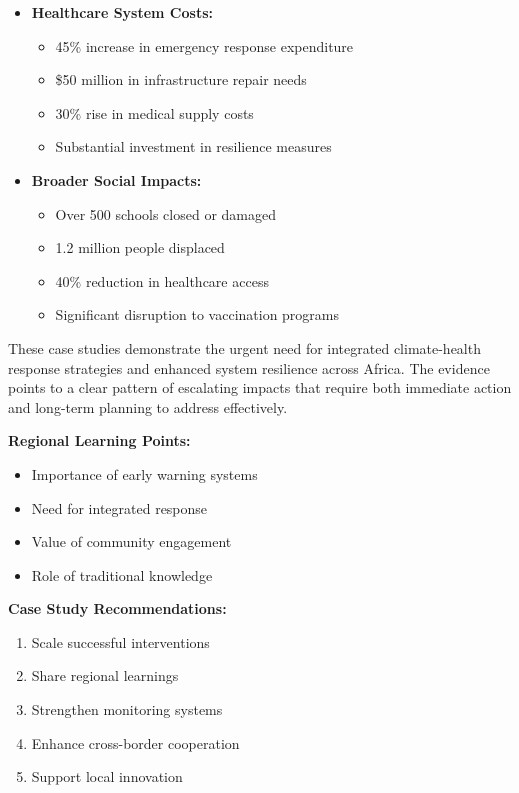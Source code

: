 \begin{itemize}
    \item \textbf{Healthcare System Costs:}
    \begin{itemize}
        \item 45\% increase in emergency response expenditure
        \item \$50 million in infrastructure repair needs
        \item 30\% rise in medical supply costs
        \item Substantial investment in resilience measures
    \end{itemize}
    
    \item \textbf{Broader Social Impacts:}
    \begin{itemize}
        \item Over 500 schools closed or damaged
        \item 1.2 million people displaced
        \item 40\% reduction in healthcare access
        \item Significant disruption to vaccination programs
    \end{itemize}
\end{itemize}

These case studies demonstrate the urgent need for integrated climate-health response strategies and enhanced system resilience across Africa. The evidence points to a clear pattern of escalating impacts that require both immediate action and long-term planning to address effectively.

\begin{keymessage}
\textbf{Regional Learning Points:}
\begin{itemize}
    \item Importance of early warning systems
    \item Need for integrated response
    \item Value of community engagement
    \item Role of traditional knowledge
\end{itemize}
\end{keymessage}

\begin{recommendation}
\textbf{Case Study Recommendations:}
\begin{enumerate}
    \item Scale successful interventions
    \item Share regional learnings
    \item Strengthen monitoring systems
    \item Enhance cross-border cooperation
    \item Support local innovation
\end{enumerate}
\end{recommendation}

